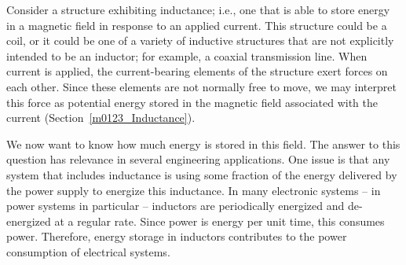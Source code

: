 

\label{m0127_Magnetic_Energy} %

Consider a structure exhibiting inductance; i.e., one that is able to store energy in a magnetic field in response to an applied current.
This structure could be a coil, or it could be one of a variety of inductive structures that are not explicitly intended to be an inductor; for example, a coaxial transmission line.
When current is applied, the current-bearing elements of the structure exert forces on each other.
Since these elements are not normally free to move, we may interpret this force as potential energy stored in the magnetic field associated with the current (Section~\ref{m0123_Inductance}).

We now want to know how much energy is stored in this field. 
The answer to this question has relevance in several engineering applications. 
One issue is that any system that includes inductance is using some fraction of the energy delivered by the power supply to energize this inductance. 
In many electronic systems -- in power systems in particular -- inductors are periodically energized and de-energized at a regular rate.  Since power is energy per unit time, this consumes power.  Therefore, energy storage in inductors contributes to the power consumption of electrical systems.

